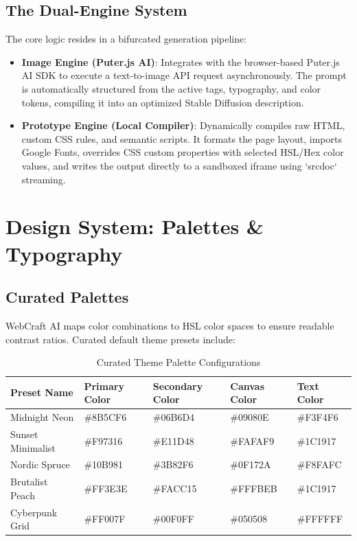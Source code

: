 \documentclass[11pt,a4paper]{article}
\begin{document}
\subsection{The Dual-Engine System}
The core logic resides in a bifurcated generation pipeline:
\begin{itemize}
    \item \textbf{Image Engine (Puter.js AI)}: Integrates with the browser-based Puter.js AI SDK to execute a text-to-image API request asynchronously. The prompt is automatically structured from the active tags, typography, and color tokens, compiling it into an optimized Stable Diffusion description.
    \item \textbf{Prototype Engine (Local Compiler)}: Dynamically compiles raw HTML, custom CSS rules, and semantic scripts. It formats the page layout, imports Google Fonts, overrides CSS custom properties with selected HSL/Hex color values, and writes the output directly to a sandboxed iframe using `srcdoc` streaming.
\end{itemize}

\section{Design System: Palettes \& Typography}

\subsection{Curated Palettes}
WebCraft AI maps color combinations to HSL color spaces to ensure readable contrast ratios. Curated default theme presets include:
\begin{table}[h]
\centering
\caption{Curated Theme Palette Configurations}
\vspace{0.5em}
\begin{tabular}{lllll}
\toprule
\textbf{Preset Name} & \textbf{Primary Color} & \textbf{Secondary Color} & \textbf{Canvas Color} & \textbf{Text Color} \\
\midrule
Midnight Neon & \#8B5CF6 & \#06B6D4 & \#09080E & \#F3F4F6 \\
Sunset Minimalist & \#F97316 & \#E11D48 & \#FAFAF9 & \#1C1917 \\
Nordic Spruce & \#10B981 & \#3B82F6 & \#0F172A & \#F8FAFC \\
Brutalist Peach & \#FF3E3E & \#FACC15 & \#FFFBEB & \#1C1917 \\
Cyberpunk Grid & \#FF007F & \#00F0FF & \#050508 & \#FFFFFF \\
\bottomrule
\end{tabular}
\end{table}
\end{document}
